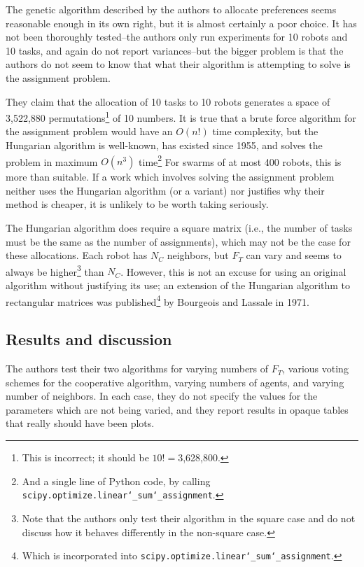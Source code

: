 \documentclass[11pt]{article}
\begin{document}
The genetic algorithm described by the authors to allocate preferences seems reasonable enough in its own right, but it is almost certainly a poor choice. It has not been thoroughly tested--the authors only run experiments for 10 robots and 10 tasks, and again do not report variances--but the bigger problem is that the authors do not seem to know that what their algorithm is attempting to solve is the assignment problem.

They claim that the allocation of 10 tasks to 10 robots generates a space of 3,522,880 permutations\footnote{This is incorrect; it should be $10! = $3,628,800.} of 10 numbers. It is true that a brute force algorithm for the assignment problem would have an $O(n!)$ time complexity, but the Hungarian algorithm is well-known, has existed since 1955, and solves the problem in maximum $O(n^3)$ time\footnote{And a single line of Python code, by calling \texttt{scipy.optimize.linear\char`_sum\char`_assignment}.} For swarms of at most 400 robots, this is more than suitable. If a work which involves solving the assignment problem neither uses the Hungarian algorithm (or a variant) nor justifies why their method is cheaper, it is unlikely to be worth taking seriously.

The Hungarian algorithm does require a square matrix (i.e., the number of tasks must be the same as the number of assignments), which may not be the case for these allocations. Each robot has $N_C$ neighbors, but $F_T$ can vary and seems to always be higher\footnote{Note that the authors only test their algorithm in the square case and do not discuss how it behaves differently in the non-square case.}  than $N_C$.  However, this is not an excuse for using an original algorithm without justifying its use; an extension of the Hungarian algorithm to rectangular matrices was published\footnote{Which is incorporated into \texttt{scipy.optimize.linear\char`_sum\char`_assignment}.} by Bourgeois and Lassale in 1971. 

\subsection*{Results and discussion}

The authors test their two algorithms for varying numbers of $F_T$, various voting schemes for the cooperative algorithm, varying numbers of agents, and varying number of neighbors. In each case, they do not specify the values for the parameters which are not being varied, and they report results in opaque tables that really should have been plots.
\end{document}
